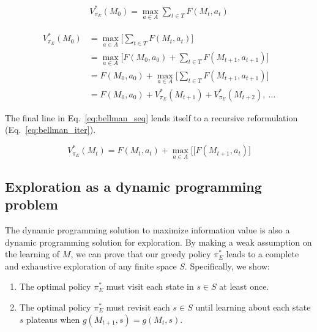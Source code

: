 \documentclass[9pt,twocolumn,twoside]{pnas-new}
\begin{document}
\begin{equation} \label{eq:V_star}
    \begin{split}
        V^*_{\pi_E}(M_0) = \max_{a \in A} \sum_{t \in T} F(M_t, a_t)
    \end{split}
\end{equation}

\begin{equation} \label{eq:bellman_seq}
    \begin{split}
        V^*_{\pi_E}(M_0) &= \max_{a \in A} \Big [\sum_{t \in T} F(M_t, a_t)\Big ]\\
                         &= \max_{a \in A} \Big [F(M_0, a_0) + \sum_{t \in T} F(M_{t+1}, a_{t+1})\Big ]\\
                         &= F(M_0, a_0) + \max_{a \in A} \Big [\sum_{t \in T} F(M_{t+1}, a_{t+1}) \Big ]\\
                         &= F(M_0, a_0) + V^*_{\pi_E}(M_{t+1}) + V^*_{\pi_E}(M_{t+2}),\ \ldots
    \end{split}
\end{equation}

The final line in Eq.~\ref{eq:bellman_seq} lends itself to a recursive reformulation (Eq.~\ref{eq:bellman_iter}).

\begin{equation} \label{eq:bellman_iter}
    V^*_{\pi_E}(M_{t}) = F(M_{t}, a_{t}) + \max_{a \in A} \Big [ [F(M_{t+1}, a_t) \Big ]
\end{equation}
    
\subsection*{Exploration as a dynamic programming problem}
The dynamic programming solution to maximize information value is also a dynamic programming solution for exploration. By making a weak assumption on the learning of $M$, we can prove that our greedy policy $\pi^*_E$ leads to a complete and exhaustive exploration of any finite space $S$. Specifically, we show:

\begin{enumerate}[noitemsep,wide=0pt,leftmargin=\dimexpr\labelwidth+2\labelsep\relax]
    \item The optimal policy $\pi^*_E$ must visit each state in $s \in S$ at least once.
    \item The optimal policy $\pi^*_E$ must revisit each $s \in S$ until learning about each state $s$ plateaus when $g(M_{t+1}, s) = g(M_{t},s)$.
\end{enumerate}
\end{document}

